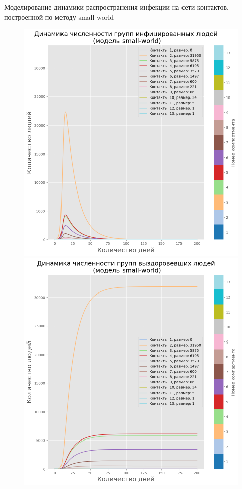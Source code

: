 \documentclass[10pt, unicode, xcolor={svgnames, table, hyperref}]{beamer}
\begin{document}
\begin{frame}{Моделирование динамики распространения инфекции на сети контактов, построенной по методу small-world}
	
	\begin{figure}[h!]
		\begin{minipage}{0.49\textwidth}
			\centering
			\includegraphics[width=1.0\textwidth]{img/sir_model_small_world_I_rural_new.png}
		\end{minipage}
		\begin{minipage}{0.49\textwidth}
			\centering
			\includegraphics[width=1.0\textwidth]{img/sir_model_small_world_R_rural_new.png}

\end{minipage}
\end{figure}
\end{frame}
\end{document}

